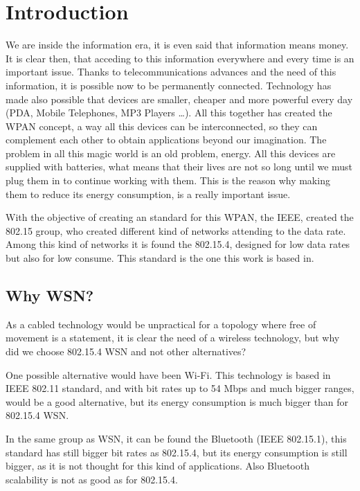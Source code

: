 \chapter{Introduction}

We are inside the information era, it is even said that information means money. It is clear then, that acceding to this information
everywhere and every time is an important issue. Thanks to telecommunications advances and the need of this information, it is
possible now to be permanently connected. Technology has made also possible that devices are smaller, cheaper and more powerful
every day (\ac{PDA}, Mobile Telephones, \ac{MP3} Players \ldots). All this together has created the \ac{WPAN} concept, a way 
all this devices can be interconnected, so they can complement each other to obtain applications beyond our imagination. The 
problem in all this magic world is an old problem, energy. All this devices are supplied with batteries, what means that their 
lives are not so long until we must plug them in to continue working with them. This is the reason why making them to reduce its 
energy consumption, is a really important issue.

With the objective of creating an standard for this \ac{WPAN}, the \ac{IEEE}, created the 802.15 group, who created different 
kind of networks attending to the data rate. Among this kind of networks it is found the 802.15.4, designed for low data rates but 
also for low consume. This standard is the one this work is based in.

\section{Why \ac{WSN}?}

As a cabled technology would be unpractical for a topology where free of movement is a statement, it is clear the need of a 
wireless technology, but why did we choose 802.15.4 \ac{WSN} and not other alternatives?

One possible alternative would have been Wi-Fi. This technology is based in \ac{IEEE} 802.11 standard, and with bit rates up to
54 Mbps and much bigger ranges, would be a good alternative, but its energy consumption is much bigger than for 802.15.4 \ac{WSN}.

In the same group as \ac{WSN}, it can be found the Bluetooth (\ac{IEEE} 802.15.1), this standard has still bigger bit rates as 
802.15.4, but its energy consumption is still bigger, as it is not thought for this kind of applications. Also Bluetooth scalability
is not as good as for 802.15.4.

